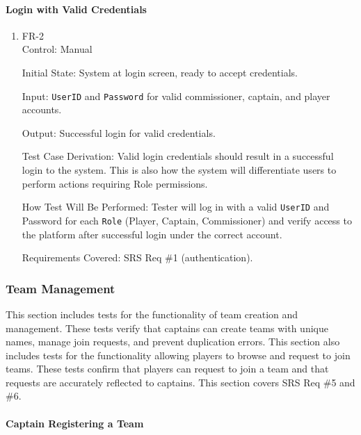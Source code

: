 \documentclass[12pt, titlepage]{article}
\begin{document}
\paragraph{Login with Valid Credentials}

\begin{enumerate}

    \item{FR-2\\}
          Control: Manual

          Initial State: System at login screen, ready to accept credentials.

          Input: \texttt{UserID} and \texttt{Password} for valid commissioner, captain, and player accounts.

          Output: Successful login for valid credentials.

          Test Case Derivation: Valid login credentials should result in a successful login to the system. This is also how the system will differentiate users to perform actions requiring Role permissions.

          How Test Will Be Performed: Tester will log in with a valid \texttt{UserID} and Password for each \texttt{Role} (Player, Captain, Commissioner) and verify access to the platform after successful login under the correct account.

          Requirements Covered: SRS Req \#1 (authentication).
\end{enumerate}

\subsubsection{Team Management}

This section includes tests for the functionality of team creation and management. These tests verify that captains can create teams with unique names, manage join requests, and prevent duplication errors. This section also includes tests for the functionality allowing players to browse and request to join teams. These tests confirm that players can request to join a team and that requests are accurately reflected to captains. This section covers SRS Req \#5 and \#6.

\paragraph{Captain Registering a Team}
\end{document}
